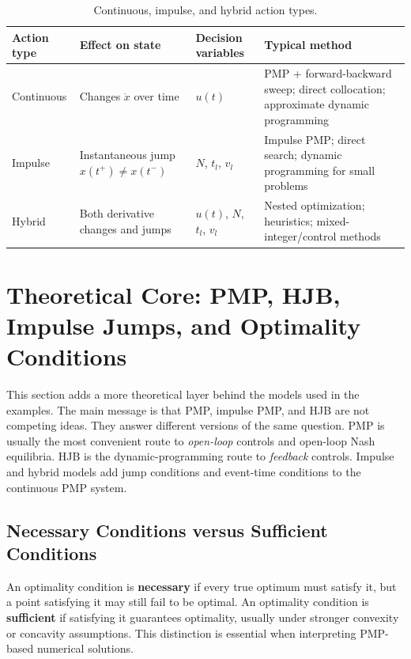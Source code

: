 \documentclass[11pt,a4paper]{article}
\begin{document}
\begin{table}[h!]
\centering
\caption{Continuous, impulse, and hybrid action types.}
\begin{tabularx}{\textwidth}{L{2.6cm}Y L{3.2cm}Y}
\toprule
\textbf{Action type} & \textbf{Effect on state} & \textbf{Decision variables} & \textbf{Typical method} \\
\midrule
Continuous & Changes $\dot{x}$ over time & $u(t)$ & PMP + forward-backward sweep; direct collocation; approximate dynamic programming \\
Impulse & Instantaneous jump $x(t^+)\neq x(t^-)$ & $N$, $t_l$, $v_l$ & Impulse PMP; direct search; dynamic programming for small problems \\
Hybrid & Both derivative changes and jumps & $u(t)$, $N$, $t_l$, $v_l$ & Nested optimization; heuristics; mixed-integer/control methods \\
\bottomrule
\end{tabularx}
\end{table}


\section{Theoretical Core: PMP, HJB, Impulse Jumps, and Optimality Conditions}

This section adds a more theoretical layer behind the models used in the examples. The main message is that PMP, impulse PMP, and HJB are not competing ideas. They answer different versions of the same question.
PMP is usually the most convenient route to \emph{open-loop} controls and open-loop Nash equilibria. HJB is the dynamic-programming route to \emph{feedback} controls. Impulse and hybrid models add jump conditions and event-time conditions to the continuous PMP system.

\subsection{Necessary Conditions versus Sufficient Conditions}

An optimality condition is \textbf{necessary} if every true optimum must satisfy it, but a point satisfying it may still fail to be optimal. An optimality condition is \textbf{sufficient} if satisfying it guarantees optimality, usually under stronger convexity or concavity assumptions. This distinction is essential when interpreting PMP-based numerical solutions.
\end{document}
